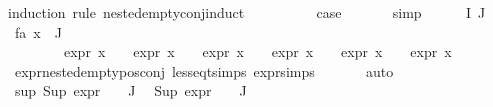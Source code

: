 \begin{isabellebody}
\isamarkupfalse%
{\isacharparenleft}{\kern0pt}induction\ rule{\isacharcolon}{\kern0pt}\ nested{\isacharunderscore}{\kern0pt}empty{\isacharunderscore}{\kern0pt}conj{\isachardot}{\kern0pt}induct{\isacharparenright}{\kern0pt}\isanewline
\ \ \isamarkupfalse%
\ {}\isanewline
\ \ \isamarkupfalse%
\ \isamarkupfalse%
\ {\isacharquery}{\kern0pt}case\ \isanewline
\ \ \ \ \isamarkupfalse%
\ simp\isanewline
{}\isamarkupfalse%
\isanewline
\ \ \isamarkupfalse%
\ {\isacharparenleft}{\kern0pt}{}\ {\isasymPhi}\ I\ J{\isacharparenright}{\kern0pt}\isanewline
\ \ \isamarkupfalse%
\ fa{\isacharunderscore}{\kern0pt}{\isasympsi}{\isacharcolon}{\kern0pt}\ {\isachardoublequoteopen}{\isasymforall}x{\isasymin}{\isasymPhi}\ {\isacharbackquote}{\kern0pt}\ J{\isachardot}{\kern0pt}\ \isanewline
\ \ \ \ \ \ \ \ expr{\isacharunderscore}{\kern0pt}{}\ x\ {\isasymle}\ {}\ {\isasymand}\ expr{\isacharunderscore}{\kern0pt}{}\ x\ {\isasymle}\ {\isasyminfinity}\ {\isasymand}\ expr{\isacharunderscore}{\kern0pt}{}\ x\ {\isasymle}\ {}\ {\isasymand}\ expr{\isacharunderscore}{\kern0pt}{}\ x\ {\isasymle}\ {}\ {\isasymand}\ expr{\isacharunderscore}{\kern0pt}{}\ x\ {\isasymle}\ {}\ {\isasymand}\ expr{\isacharunderscore}{\kern0pt}{}\ x\ {\isasymle}\ {}{\isachardoublequoteclose}\isanewline
\ \ \ \ \isamarkupfalse%
\ expr{\isacharunderscore}{\kern0pt}nested{\isacharunderscore}{\kern0pt}empty{\isacharunderscore}{\kern0pt}pos{\isacharunderscore}{\kern0pt}conj\ less{\isacharunderscore}{\kern0pt}eq{\isacharunderscore}{\kern0pt}t{\isachardot}{\kern0pt}simps\ expr{\isachardot}{\kern0pt}simps\ \isanewline
\ \ \ \ \isamarkupfalse%
\ auto\isanewline
\ \ \isamarkupfalse%
\ sup{\isacharunderscore}{\kern0pt}{\isasympsi}{\isacharcolon}{\kern0pt}\ {\isachardoublequoteopen}Sup\ {\isacharparenleft}{\kern0pt}{\isacharparenleft}{\kern0pt}expr{\isacharunderscore}{\kern0pt}{}\ {\isasymcirc}\ {\isasymPhi}{\isacharparenright}{\kern0pt}\ {\isacharbackquote}{\kern0pt}\ J{\isacharparenright}{\kern0pt}\ {\isasymle}\ {}{\isachardoublequoteclose}\isanewline
{\isachardoublequoteopen}Sup\ {\isacharparenleft}{\kern0pt}{\isacharparenleft}{\kern0pt}expr{\isacharunderscore}{\kern0pt}{}\ {\isasymcirc}\ {\isasymPhi}{\isacharparenright}{\kern0pt}\ {\isacharbackquote}{\kern0pt}\ J{\isacharparenright}{\kern0pt}\ {\isasymle}\ {\isasyminfinity}{\isachardoublequoteclose}\isanewline

\end{isabellebody}
